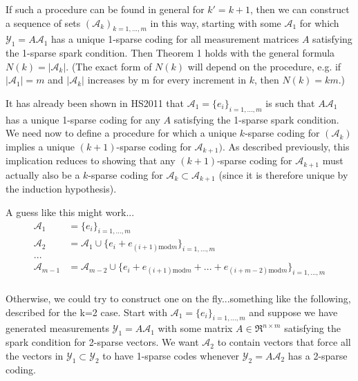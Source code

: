\documentclass{article}
\begin{document}
If such a procedure can be found in general for $k' = k+1$, then we can construct a sequence of sets $(\mathcal{A}_k)_{k=1,...,m}$ in this way, starting with some $\mathcal{A}_1$ for which $\mathcal{Y}_1 = A\mathcal{A}_1$ has a unique 1-sparse coding for all measurement matrices $A$ satisfying the 1-sparse spark condition. Then Theorem 1 holds with the general formula $N(k)= |\mathcal{A}_k|$. (The exact form of $N(k)$ will depend on the procedure, e.g. if $|\mathcal{A}_1| = m$ and $|\mathcal{A}_k|$ increases by m for every increment in $k$, then $N(k) = km$.)

It has already been shown in HS2011 that $\mathcal{A}_1 = \{ e_i \}_{i=1,...,m}$ is such that $A\mathcal{A}_1$ has a unique 1-sparse coding for any $A$ satisfying the 1-sparse spark condition. We need now to define a procedure for which a unique $k$-sparse coding for $(\mathcal{A}_k)$ implies a unique $(k+1)$-sparse coding for $\mathcal{A}_{k+1})$. As described previously, this implication reduces to showing that any $(k+1)$-sparse coding for $\mathcal{A}_{k+1}$ must actually also be a $k$-sparse coding for $\mathcal{A}_k \subset \mathcal{A}_{k+1}$ (since it is therefore unique by the induction hypothesis). 

A guess like this might work...
\begin{align*}
\mathcal{A}_1 &= \{ e_i \}_{i=1,...,m} \\
\mathcal{A}_2 &= \mathcal{A}_1 \cup  \{ e_{i} + e_{(i+1) \text{mod} {m}} \}_{i=1,...,m} \\
... \\
\mathcal{A}_{m-1} &= \mathcal{A}_{m-2} \cup \{e_{i} + e_{(i+1) \text{mod} {m}} + ... + e_{(i+m-2) \text{mod} {m}} \}_{i=1,...,m}\\
\end{align*}

Otherwise, we could try to construct one on the fly...something like the following, described for the k=2 case. Start with $\mathcal{A}_1 = \{ e_i \}_{i=1,...,m}$ and suppose we have generated measurements $\mathcal{Y}_1 = A\mathcal{A}_1$ with some matrix $A \in \Re^{n \times m}$ satisfying the spark condition for 2-sparse vectors. We want $\mathcal{A}_2$ to contain vectors that force all the vectors in $\mathcal{Y}_1 \subset \mathcal{Y}_2$ to have 1-sparse codes whenever $\mathcal{Y}_2 = A\mathcal{A}_2$ has a 2-sparse coding. 
\end{document}
